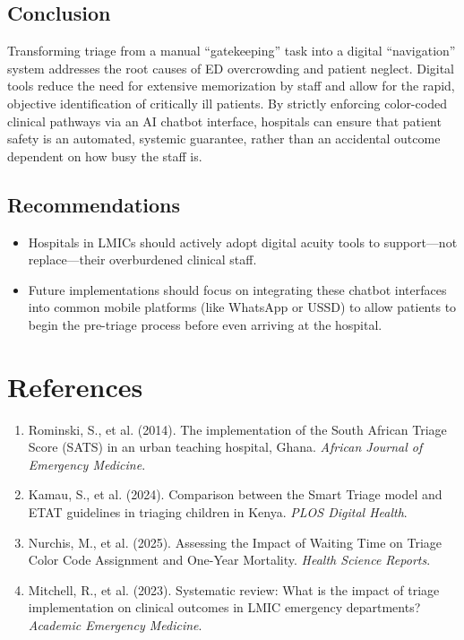 \documentclass[12pt, a4paper]{article}
\begin{document}
	\subsection*{Conclusion}
	Transforming triage from a manual ``gatekeeping'' task into a digital ``navigation'' system addresses the root causes of ED overcrowding and patient neglect. Digital tools reduce the need for extensive memorization by staff and allow for the rapid, objective identification of critically ill patients. By strictly enforcing color-coded clinical pathways via an AI chatbot interface, hospitals can ensure that patient safety is an automated, systemic guarantee, rather than an accidental outcome dependent on how busy the staff is. 
	
	\subsection*{Recommendations}
	\begin{itemize}
		\item Hospitals in LMICs should actively adopt digital acuity tools to support---not replace---their overburdened clinical staff.
		\item Future implementations should focus on integrating these chatbot interfaces into common mobile platforms (like WhatsApp or USSD) to allow patients to begin the pre-triage process before even arriving at the hospital.
	\end{itemize}
	
	\section{References}
	\begin{enumerate}
		\item Rominski, S., et al. (2014). The implementation of the South African Triage Score (SATS) in an urban teaching hospital, Ghana. \textit{African Journal of Emergency Medicine}.
		\item Kamau, S., et al. (2024). Comparison between the Smart Triage model and ETAT guidelines in triaging children in Kenya. \textit{PLOS Digital Health}.
		\item Nurchis, M., et al. (2025). Assessing the Impact of Waiting Time on Triage Color Code Assignment and One-Year Mortality. \textit{Health Science Reports}.
		\item Mitchell, R., et al. (2023). Systematic review: What is the impact of triage implementation on clinical outcomes in LMIC emergency departments? \textit{Academic Emergency Medicine}.
	\end{enumerate}
	
\end{document}
